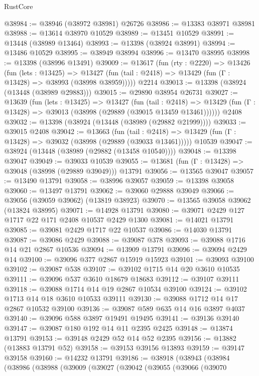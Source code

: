 \begin{lexlean}{RustCore}
\begin{coremodule}
@38984 := @38946 (@38972 @38981) @26726
@38986 := @13383 @38971 @38981
@38988 := @13614 @38970 @10529
@38989 := @13451 @10529
@38991 := @13448 (@38989 @13464)
@38993 := @13398 (@38924 @38991)
@38994 := @13486 @10529
@38995 := @38949 @38994
@38996 := @13470 @38995
@38998 := @13398 (@38996 @13491)
@39009 := @13617
    (fun (rty : @2220) =>
    @13426
      (fun (lets : @13425) =>
      @13427 (fun (tail : @2418) => @13429 (fun (Γ : @13428) => @38993 (@38998 @38959)))))
    @2214
@39013 := @13398 (@38924 (@13448 (@38989 @29883)))
@39015 := @29890 @38954 @26731
@39027 := @13639
    (fun (lets : @13425) =>
    @13427
      (fun (tail : @2418) =>
      @13429 (fun (Γ : @13428) => @39013 (@38998 (@29889 (@39015 @13459 @13461))))))
    @2408
@39032 := @13398 (@38924 (@13448 (@38989 (@29882 @21999))))
@39033 := @39015 @2408
@39042 := @13663
    (fun (tail : @2418) => @13429 (fun (Γ : @13428) => @39032 (@38998 (@29889 (@39033 @13461)))))
    @10539
@39047 := @38924 (@13448 (@38989 (@29882 (@13458 @10540))))
@39048 := @13398 @39047
@39049 := @39033 @10539
@39055 := @13681 (fun (Γ : @13428) => @39048 (@38998 (@29889 @39049))) @13791
@39056 := @13565 @39047
@39057 := @13490 @13791
@39058 := @38996 @39057
@39059 := @13398 @39058
@39060 := @13497 @13791
@39062 := @39060 @29888 @39049
@39066 := @39056 (@39059 @39062) (@13819 @38923)
@39070 := @13565 @39058 @39062 (@13824 @38995)
@39071 := @14928 @13791
@39080 := @39071 @2429 @127 @1717 @22 @171 @2408 @10537 @2429 @1300
@39081 := @14021 @13791
@39085 := @39081 @2429 @1717 @22 @10537
@39086 := @14030 @13791
@39087 := @39086 @2429
@39088 := @39087 @378
@39093 := @39088 @1716 @14 @21 @2867 @10536
@39094 := @13909 @13791
@39096 := @39094 @2429 @14
@39100 := @39096 @377 @2867 @15919 @15923
@39101 := @39093 @39100
@39102 := @39087 @538
@39107 := @39102 @1715 @14 @20 @3610 @10535
@39111 := @39096 @537 @3610 @18679 @18683
@39112 := @39107 @39111
@39118 := @39088 @1714 @14 @19 @2867 @10534 @39100
@39124 := @39102 @1713 @14 @18 @3610 @10533 @39111
@39130 := @39088 @1712 @14 @17 @2867 @10532 @39100
@39136 := @39087 @589 @635 @14 @16 @3897 @4037
@39140 := @39096 @588 @3897 @19491 @19495
@39141 := @39136 @39140
@39147 := @39087 @180 @192 @14 @11 @2395 @2425
@39148 := @13874 @13791
@39153 := @39148 @2429 @52 @14 @52 @2395
@39156 := @13882 (@13883 @13791 @52)
@39158 := @39153 @39156 @13893
@39159 := @39147 @39158
@39160 := @14232 @13791
@39186 := @38918
    (@38943
      (@38984
        (@38986
          (@38988
            (@39009
              (@39027
                (@39042
                  (@39055
                    (@39066
                      (@39070

\end{coremodule}
\end{lexlean}
